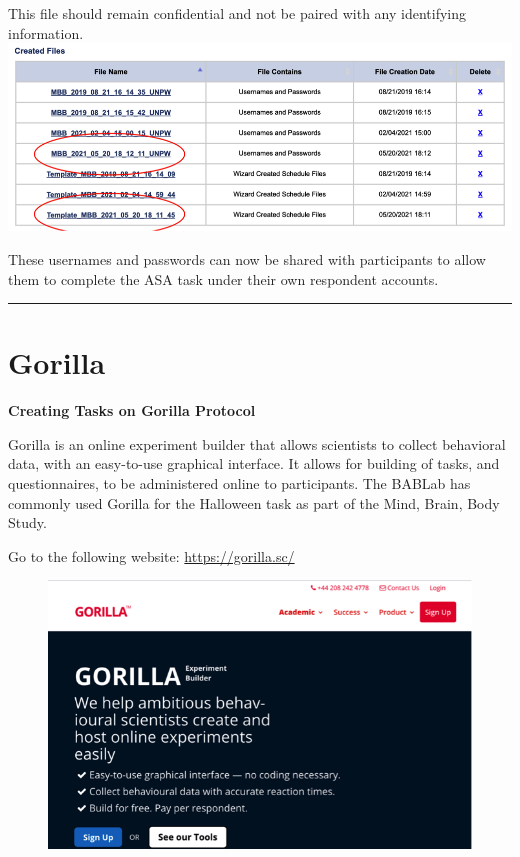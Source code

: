 \documentclass[]{book}
\begin{document}
This file should remain confidential and not be paired with any identifying information.
\includegraphics{images/research_protocols/asa/asa_9.png}

These usernames and passwords can now be shared with participants to allow them to complete the ASA task under their own respondent accounts.

\begin{center}\rule{0.5\linewidth}{0.5pt}\end{center}

\hypertarget{gorilla}{%
\section{Gorilla}\label{gorilla}}

\textbf{Creating Tasks on Gorilla Protocol}

Gorilla is an online experiment builder that allows scientists to collect behavioral data, with an easy-to-use graphical interface. It allows for building of tasks, and questionnaires, to be administered online to participants. The BABLab has commonly used Gorilla for the Halloween task as part of the Mind, Brain, Body Study.

Go to the following website: \url{https://gorilla.sc/}

\begin{figure}
\centering
\includegraphics{images/research_protocols/gorilla/gorilla1.png}
\caption{}
\end{figure}
\end{document}
